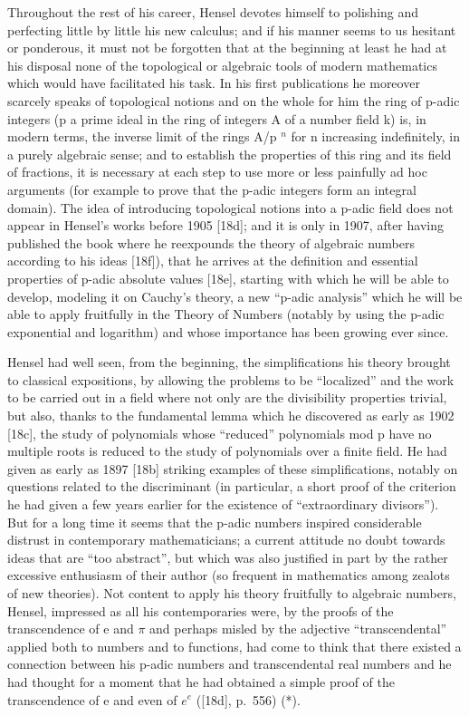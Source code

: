 Throughout the rest of his career, Hensel devotes himself to polishing and perfecting little by little his new calculus; and if his manner seems to us hesitant or ponderous, it must not be forgotten that at the beginning at least he had at his disposal none of the topological or algebraic tools of modern mathematics which would have facilitated his task. In his first publications he moreover scarcely speaks of topological notions and on the whole for him the ring of p-adic integers (p a prime ideal in the ring of integers A of a number field k) is, in modern terms, the inverse limit of the rings A/p \(^{n}\) for n increasing indefinitely, in a purely algebraic sense; and to establish the properties of this ring and its field of fractions, it is necessary at each step to use more or less painfully ad hoc arguments (for example to prove that the p-adic integers form an integral domain). The idea of introducing topological notions into a p-adic field does not appear in Hensel's works before 1905 {[}18d{]}; and it is only in 1907, after having published the book where he reexpounds the theory of algebraic numbers according to his ideas {[}18f{]}), that he arrives at the definition and essential properties of p-adic absolute values {[}18e{]}, starting with which he will be able to develop, modeling it on Cauchy's theory, a new ``p-adic analysis'' which he will be able to apply fruitfully in the Theory of Numbers (notably by using the p-adic exponential and logarithm) and whose importance has been growing ever since.

Hensel had well seen, from the beginning, the simplifications his theory brought to classical expositions, by allowing the problems to be ``localized'' and the work to be carried out in a field where not only are the divisibility properties trivial, but also, thanks to the fundamental lemma which he discovered as early as 1902 {[}18c{]}, the study of polynomials whose ``reduced'' polynomials mod p have no multiple roots is reduced to the study of polynomials over a finite field. He had given as early as 1897 {[}18b{]} striking examples of these simplifications, notably on questions related to the discriminant (in particular, a short proof of the criterion he had given a few years earlier for the existence of ``extraordinary divisors''). But for a long time it seems that the p-adic numbers inspired considerable distrust in contemporary mathematicians; a current attitude no doubt towards ideas that are ``too abstract'', but which was also justified in part by the rather excessive enthusiasm of their author (so frequent in mathematics among zealots of new theories). Not content to apply his theory fruitfully to algebraic numbers, Hensel, impressed as all his contemporaries were, by the proofs of the transcendence of e and \(\pi\) and perhaps misled by the adjective ``transcendental'' applied both to numbers and to functions, had come to think that there existed a connection between his p-adic numbers and transcendental real numbers and he had thought for a moment that he had obtained a simple proof of the transcendence of e and even of \(e^{e}\) ({[}18d{]}, p.~556) (*).

